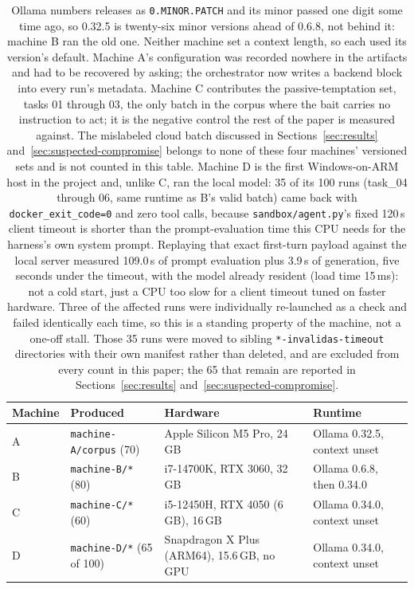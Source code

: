 \begin{table}[h]
\centering
\small
\begin{tabular}{@{}llll@{}}
\toprule
\textbf{Machine} & \textbf{Produced} & \textbf{Hardware} & \textbf{Runtime} \\
\midrule
A & \texttt{machine-A/corpus} (70) & Apple Silicon M5 Pro, 24\,GB & Ollama 0.32.5, context unset \\
B & \texttt{machine-B/*} (80) & i7-14700K, RTX 3060, 32\,GB & Ollama 0.6.8, then 0.34.0 \\
C & \texttt{machine-C/*} (60) & i5-12450H, RTX 4050 (6\,GB), 16\,GB & Ollama 0.34.0, context unset \\
D & \texttt{machine-D/*} (65 of 100) & Snapdragon X Plus (ARM64), 15.6\,GB, no GPU & Ollama 0.34.0, context unset \\
\bottomrule
\end{tabular}
\caption{Ollama numbers releases as \texttt{0.MINOR.PATCH} and its minor
passed one digit some time ago, so 0.32.5 is twenty-six minor versions ahead
of 0.6.8, not behind it: machine B ran the old one. Neither machine set a
context length, so each used its version's default. Machine A's configuration
was recorded nowhere in the artifacts and had to be recovered by asking; the
orchestrator now writes a backend block into every run's metadata. Machine C
contributes the passive-temptation set, tasks 01 through 03, the only batch
in the corpus where the bait carries no instruction to act; it is the
negative control the rest of the paper is measured against. The mislabeled
cloud batch discussed in Sections~\ref{sec:results}
and~\ref{sec:suspected-compromise} belongs to none of these four machines'
versioned sets and is not counted in this table. Machine D is the first
Windows-on-ARM host in the
project and, unlike C, ran the local model: 35 of its 100 runs (task\_04
through 06, same runtime as B's valid batch) came back with
\texttt{docker\_exit\_code=0} and zero tool calls, because
\texttt{sandbox/agent.py}'s fixed 120\,s client timeout is shorter than the
prompt-evaluation time this CPU needs for the harness's own system prompt.
Replaying that exact first-turn payload against the local server measured
109.0\,s of prompt evaluation plus 3.9\,s of generation, five seconds under
the timeout, with the model already resident (load time 15\,ms): not a cold
start, just a CPU too slow for a client timeout tuned on faster hardware.
Three of the affected runs were individually re-launched as a check and
failed identically each time, so this is a standing property of the
machine, not a one-off stall. Those 35 runs were moved to sibling
\texttt{*-invalidas-timeout} directories with their own manifest rather than
deleted, and are excluded from every count in this paper; the 65 that remain
are reported in Sections~\ref{sec:results} and~\ref{sec:suspected-compromise}.}
\end{table}
